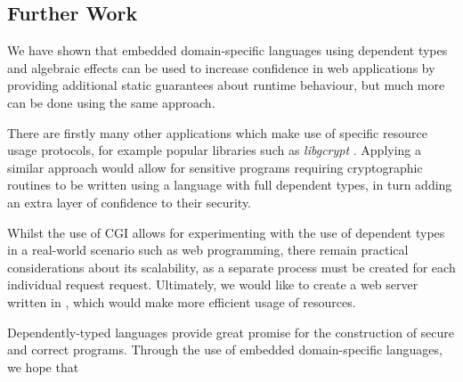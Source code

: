 \documentclass[preprint]{sigplanconf}
\begin{document}
\subsection{Further Work}
We have shown that embedded domain-specific languages using dependent types and algebraic effects can be used to increase confidence in web applications by providing additional static guarantees about runtime behaviour, but much more can be done using the same approach.

There are firstly many other applications which make use of specific resource usage protocols, for example popular libraries such as \textit{libgcrypt} \cite{libgcrypt}. Applying a similar approach would allow for sensitive programs requiring cryptographic routines to be written using a language with full dependent types, in turn adding an extra layer of confidence to their security. 

Whilst the use of CGI allows for experimenting with the use of dependent types in a real-world scenario such as web programming, there remain practical considerations about its scalability, as a separate process must be created for each individual request request. Ultimately, we would like to create a web server written in \idris{}, which would make more efficient usage of resources. 

Dependently-typed languages provide great promise for the construction of secure and correct programs. Through the use of embedded domain-specific languages, we hope that





\acks






%
%
\end{document}
